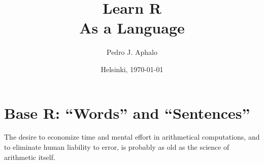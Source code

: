 \documentclass[krantz2]{krantz}\usepackage{knitr}
\begin{document}

\title{\Huge{\sffamily Learn R\\{\Large As a Language}}}

\author{Pedro J. Aphalo}

\date{Helsinki, \today}


















\frontmatter

\maketitle

\newpage

\setcounter{page}{5} %
\tableofcontents
\listoffigures
\listoftables



%



\mainmatter









\chapter{Base R: ``Words'' and ``Sentences''}\label{chap:R:as:calc}

\begin{VF}
The desire to economize time and mental effort in arithmetical computations, and to eliminate human liability to error, is probably as old as the science of arithmetic itself.

\nocite{Aiken1964}
\end{VF}

\end{document}
